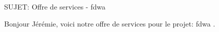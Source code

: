 SUJET: Offre de services - fdwa \par Bonjour Jérémie, voici notre offre de services pour le projet: fdwa .